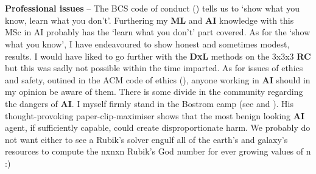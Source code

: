 \\
\\
\textbf{Professional issues} -- The BCS code of conduct (\cite{BCS}) tells us to `show what you know, learn what you don't'. Furthering my \textbf{ML} and \textbf{AI} knowledge with this MSc in AI probably has the `learn what you don't' part covered. As for the `show what you know', I have endeavoured to show honest and sometimes modest, results. I would have liked to go further with the \textbf{DxL} methods on the 3x3x3 \textbf{RC} but this was sadly not possible within the time imparted. As for issues of ethics and safety, outined in the ACM code of ethics (\cite{ACM}), anyone working in \textbf{AI} should in my opinion be aware of them. There is some divide in the community regarding the dangers of \textbf{AI}. I myself firmly stand in the Bostrom camp (see \cite{https://doi.org/10.1111/1758-5899.12718} and \cite{Bostrom2014}). His thought-provoking paper-clip-maximiser shows that the most benign looking \textbf{AI} agent, if sufficiently capable, could create disproportionate harm. We probably do not want either to see a Rubik's solver engulf all of the earth's and galaxy's resources to compute the nxnxn Rubik's God number for ever growing values of n :)
